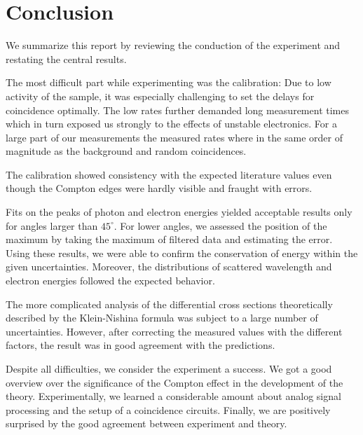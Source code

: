 \section{Conclusion}
We summarize this report by reviewing the conduction of the experiment and restating the central results.

The most difficult part while experimenting was the calibration: Due to low activity of the sample, it was especially 
challenging to set the delays for coincidence optimally. The low rates further demanded long measurement times which in 
turn exposed us strongly to the effects of unstable electronics. For a large part of our measurements the measured rates 
where in the same order of magnitude as the background and random coincidences. 

The calibration showed consistency with the expected literature values even though the Compton edges were hardly visible 
and fraught with errors. 

Fits on the peaks of photon and electron energies yielded acceptable results only for angles larger than $45^\circ$. 
For lower angles, we assessed the position of the maximum by taking the maximum of filtered data and estimating the error. 
Using these results, we were able to confirm the conservation of energy within the given uncertainties. Moreover, 
the distributions of scattered wavelength and electron energies followed the expected behavior. 

The more complicated analysis of the differential cross sections theoretically described by the Klein-Nishina formula was 
subject to a large number of uncertainties. However, after correcting the measured values with the different factors, 
the result  was in good agreement with the predictions.  

Despite all difficulties, we consider the experiment a success. We got a good overview over the significance of the Compton
effect in the development of the theory. Experimentally, we learned a considerable amount about analog signal processing 
and the setup of a coincidence circuits. Finally, we are positively surprised by the good agreement between experiment and 
theory. 
